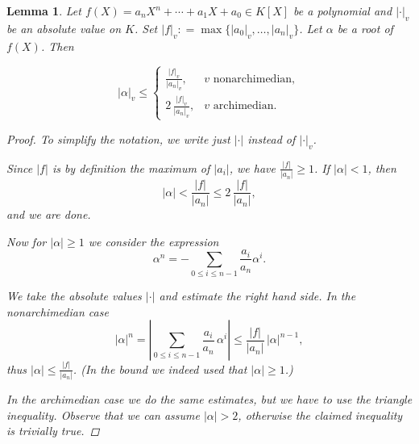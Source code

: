 \documentclass{article}
\newcommand{\dfn}{\mathrel{\mathop:}=}
\theoremstyle{myplain}
\newtheorem{lemma}[proposition]{Lemma}
\theoremstyle{mydefinition}
\begin{document}
\begin{lemma}
  Let $f (X) = a_n X^n + \cdots + a_1 X + a_0 \in K [X]$ be a polynomial and
  $|\cdot|_v$ be an absolute value on $K$. Set
  $|f|_v \dfn \max \{ |a_0|_v, \ldots, |a_n|_v \}$. Let $\alpha$ be a root of
  $f (X)$. Then

  \[ |\alpha|_v \le
    \left\{\begin{array}{rl}
             \frac{|f|_v}{|a_n|_v}, & v \text{ nonarchimedian},\\
             2 \, \frac{|f|_v}{|a_n|_v}, & v \text{ archimedian}.
           \end{array}\right.\]

  \begin{proof}
    To simplify the notation, we write just $|\cdot|$ instead of $|\cdot|_v$.

    Since $|f|$ is by definition the maximum of $|a_i|$, we have
    $\frac{|f|}{|a_n|} \ge 1$. If $|\alpha| < 1$, then
    $$|\alpha| < \frac{|f|}{|a_n|} \le 2\,\frac{|f|}{|a_n|},$$
    and we are done.

    \vspace{1em}

    Now for $|\alpha| \ge 1$ we consider the expression
    $$\alpha^n = - \sum_{0 \le i \le n-1} \frac{a_i}{a_n} \alpha^i.$$

    We take the absolute values $|\cdot|$ and estimate the right hand side. In
    the nonarchimedian case
    $$|\alpha|^n = \left|\sum_{0 \le i \le n-1} \frac{a_i}{a_n} \, \alpha^i\right| \le \frac{|f|}{|a_n|} \, |\alpha|^{n-1},$$
    thus $|\alpha| \le \frac{|f|}{|a_n|}$. (In the bound we indeed used that $|\alpha| \ge 1$.)

    \vspace{1em}

    In the archimedian case we do the same estimates, but we have to use the
    triangle inequality. Observe that we can assume $|\alpha| > 2$, otherwise
    the claimed inequality is trivially true.


\end{proof}
\end{lemma}
\end{document}
